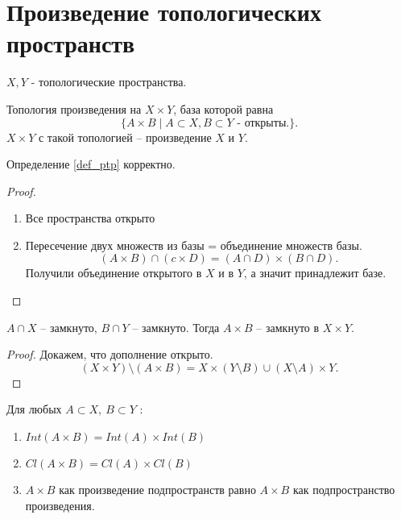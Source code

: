 \documentclass[12pt]{report}
\newcommand{\incfig}[1]{%
    \def\svgwidth{\columnwidth}
    {#1.pdf_tex}
}
\begin{document}
\section{Произведение топологических пространств}
\begin{defn}\label{def_ptp}
    $X, Y$ - топологические пространства.

    Топология произведения на $X \times Y$, база которой равна 
    \[
    \{A \times B \mid A \subset X, B \subset Y \mbox{ - открыты.}\}
    .\] 
    $X \times Y$ с такой топологией -- произведение $X$ и $Y$.
\end{defn}
\begin{thm}
    Определение \ref{def_ptp} корректно.
\end{thm}
\begin{proof}
    \begin{enumerate}
        \item Все пространства открыто
	\item Пересечение двух множеств из базы = объединение множеств базы.
\[
    (A \times B) \cap (c \times D) = (A\cap D) \times (B\cap D)
.\] 
Получили объединение открытого в $X$ и в $Y$, а значит принадлежит базе.
    \end{enumerate}
\end{proof}
\begin{thm}
    $A \cap X$ -- замкнуто, $B \cap Y$ -- замкнуто. Тогда $A \times B $ -- замкнуто в $X \times Y$.
\end{thm}
\begin{proof}
    Докажем, что дополнение открыто.
    \[
	(X \times Y) \setminus(A \times B) = X \times (Y \setminus B) \cup (X \setminus A) \times Y
    .\] 
\end{proof}
\begin{probl}
    Для любых $A \subset X, ~ B \subset Y$ :
    \begin{enumerate}
	\item $Int (A \times B) = Int(A) \times Int(B)$
	\item  $Cl (A \times B) = Cl(A) \times Cl(B)$
	\item  $A \times B$  как произведение подпространств равно $A \times B$ как подпространство произведения.
    \end{enumerate}
\end{probl}
\end{document}
